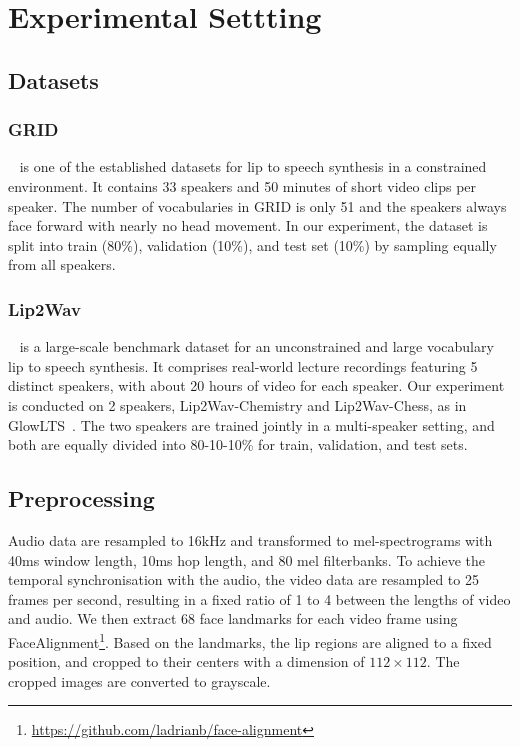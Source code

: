 \documentclass[letterpaper]{article} %
\begin{document}
\section{Experimental Settting}
\subsection{Datasets}
\subsubsection{GRID}~\cite{cooke2006audio} is one of the established datasets for lip to speech synthesis in a constrained environment. 
It contains 33 speakers and 50 minutes of short video clips per speaker.
The number of vocabularies in GRID is only 51 and the speakers always face forward with nearly no head movement. 
In our experiment, the dataset is split into train (80\%), validation (10\%), and test set (10\%) by sampling equally from all speakers.

\subsubsection{Lip2Wav}~\cite{prajwal2020learning} is a large-scale benchmark dataset for an unconstrained and large vocabulary lip to speech synthesis. It comprises real-world lecture recordings featuring 5 distinct speakers, with about 20 hours of video for each speaker. Our experiment is conducted on 2 speakers, Lip2Wav-Chemistry and Lip2Wav-Chess, as in GlowLTS~\cite{he2022flow}. The two speakers are trained jointly in a multi-speaker setting, and both are equally divided into 80-10-10\% for train, validation, and test sets.

\subsection{Preprocessing}
Audio data are resampled to 16kHz and transformed to mel-spectrograms with 40ms window length, 10ms hop length, and 80 mel filterbanks. 
To achieve the temporal synchronisation with the audio, the video data are resampled to 25 frames per second, resulting in a fixed ratio of 1 to 4 between the lengths of video and audio.
We then extract 68 face landmarks for each video frame using FaceAlignment\footnote{\url{https://github.com/ladrianb/face-alignment}}. 
Based on the landmarks, the lip regions are aligned to a fixed position, and cropped to their centers with a dimension of $112 \times 112$.
The cropped images are converted to grayscale.
\end{document}
